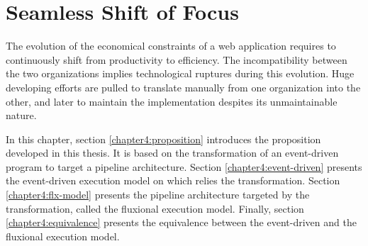 \chapter{Seamless Shift of Focus} \label{chapter4}
\minitoc
\eject

The evolution of the economical constraints of a web application requires to continuously shift from productivity to efficiency.
The incompatibility between the two organizations implies technological ruptures during this evolution.
Huge developing efforts are pulled to translate manually from one organization into the other, and later to maintain the implementation despites its unmaintainable nature.

In this chapter, section \ref{chapter4:proposition} introduces the proposition developed in this thesis.
It is based on the transformation of an event-driven program to target a pipeline architecture.
Section \ref{chapter4:event-driven} presents the event-driven execution model on which relies the transformation.
Section \ref{chapter4:flx-model} presents the pipeline architecture targeted by the transformation, called the fluxional execution model.
Finally, section \ref{chapter4:equivalence} presents the equivalence between the event-driven and the fluxional execution model.





